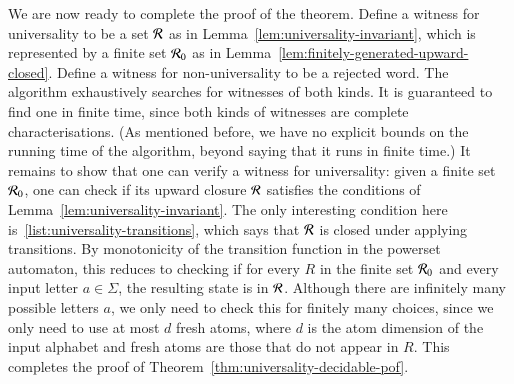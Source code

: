 We are now ready to complete the proof of the theorem. Define a witness for universality to be a set ${\mathcal R}$ as in Lemma~\ref{lem:universality-invariant}, which is represented by a finite set ${\mathcal R}_0$ as in Lemma~\ref{lem:finitely-generated-upward-closed}. Define a witness for non-universality to be a rejected word. The algorithm exhaustively searches for witnesses of both kinds. It is  guaranteed to find one in finite time, since both kinds of witnesses are complete characterisations. (As mentioned before, we have no explicit bounds on the running time of the algorithm, beyond saying that it runs in finite time.) It remains to show that one can verify a witness for universality: given a finite set ${\mathcal R}_0$, one can check if its upward closure ${\mathcal R}$ satisfies the conditions of Lemma~\ref{lem:universality-invariant}. The only interesting condition here is~\ref{list:universality-transitions}, which says that ${\mathcal R}$ is closed under applying transitions. By monotonicity of the transition function in the powerset automaton, this reduces to checking if for every $R$ in the finite set ${\mathcal R}_0$ and every input letter $a \in \Sigma$, the resulting state is in ${\mathcal R}$. Although there are infinitely many possible letters $a$, we only need to check this for finitely many choices, since we only need to use at most $d$ fresh atoms, where $d$ is the atom dimension of the input alphabet and fresh atoms are those that do not appear in $R$. This completes the proof of Theorem~\ref{thm:universality-decidable-pof}.


\exercisepart



